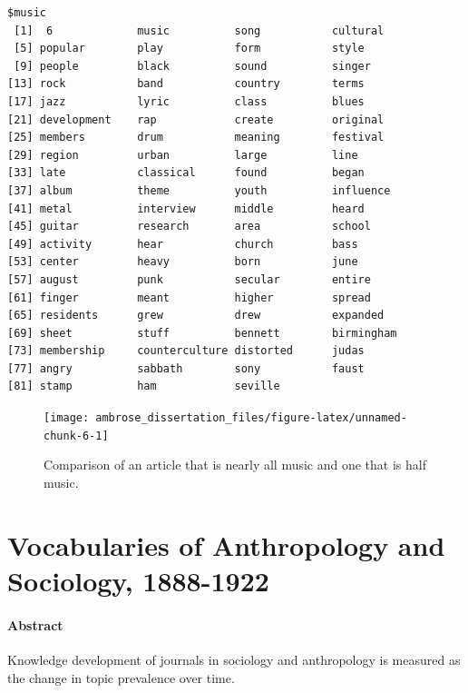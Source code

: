 \documentclass[]{book}
\theoremstyle{definition}
\theoremstyle{definition}
\theoremstyle{definition}
\theoremstyle{remark}
\begin{document}
\begin{verbatim}
$music
 [1]  6             music          song           cultural      
 [5] popular        play           form           style         
 [9] people         black          sound          singer        
[13] rock           band           country        terms         
[17] jazz           lyric          class          blues         
[21] development    rap            create         original      
[25] members        drum           meaning        festival      
[29] region         urban          large          line          
[33] late           classical      found          began         
[37] album          theme          youth          influence     
[41] metal          interview      middle         heard         
[45] guitar         research       area           school        
[49] activity       hear           church         bass          
[53] center         heavy          born           june          
[57] august         punk           secular        entire        
[61] finger         meant          higher         spread        
[65] residents      grew           drew           expanded      
[69] sheet          stuff          bennett        birmingham    
[73] membership     counterculture distorted      judas         
[77] angry          sabbath        sony           faust         
[81] stamp          ham            seville       
\end{verbatim}

\begin{figure}

{\centering \texttt{[image: ambrose\_dissertation\_files/figure-latex/unnamed-chunk-6-1]} 

}

\caption{Comparison of an article that is nearly all music and one that is half music.}\label{fig:unnamed-chunk-6}
\end{figure}

\hypertarget{voc}{%
\chapter{Vocabularies of Anthropology and Sociology,
1888-1922}\label{voc}}

\hypertarget{abstract-3}{%
\subsubsection*{Abstract}\label{abstract-3}}


Knowledge development of journals in sociology and
anthropology is measured as the change in topic prevalence over time.
\end{document}
